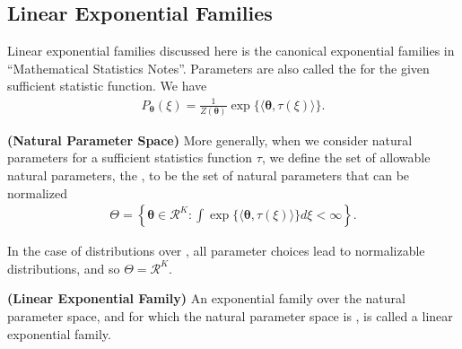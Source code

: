 \documentclass{article}
\newcommand{\bfs}[1]{\textbf{({#1}) }}
\begin{document}
\subsection{Linear Exponential Families}
Linear exponential families discussed here is the canonical exponential families in ``Mathematical Statistics Notes''. Parameters are also called the  for the given sufficient statistic function. 
We have 
\begin{align*}
P_{\boldsymbol{\theta}}(\xi)=\frac{1}{Z(\boldsymbol{\theta})} \exp \{\langle\boldsymbol{\theta}, \tau(\xi)\rangle\} .
\end{align*}
\begin{defa}\bfs{Natural Parameter Space}
More generally, when we consider natural parameters for a sufficient statistics function $\tau$, we define the set of allowable natural parameters, the , to be the set of natural parameters that can be normalized
\begin{align*}
\Theta=\left\{\boldsymbol{\theta} \in \mathcal{R}^{K}: \int \exp \{\langle\boldsymbol{\theta}, \tau(\xi)\rangle\} d \xi<\infty\right\} .
\end{align*}
\end{defa}
\begin{rema}
In the case of distributions over , all parameter choices lead to normalizable distributions, and so $\Theta=\mathcal{R}^{K}$.
\end{rema}
 
 \begin{defa}\bfs{Linear Exponential Family}
 An exponential family over the natural parameter space, and for which the natural parameter space is , is called a linear exponential family.
 \end{defa}
\end{document}
